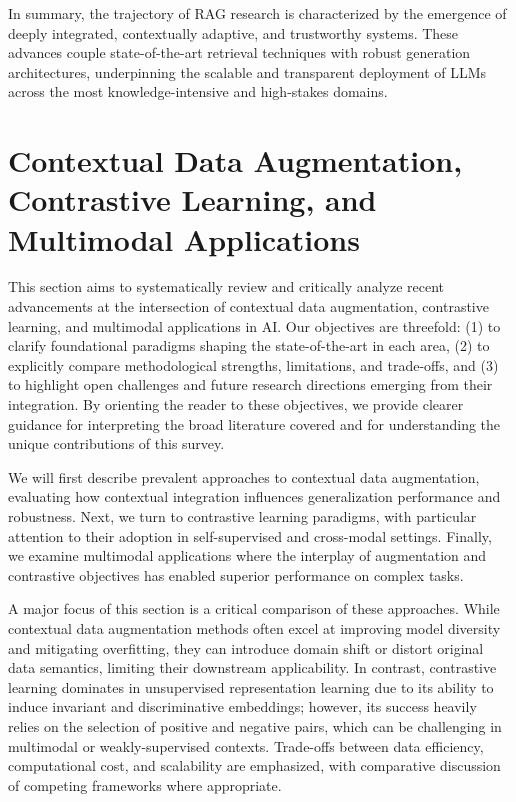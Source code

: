 \documentclass[sigconf]{acmart}
\begin{document}
In summary, the trajectory of RAG research is characterized by the emergence of deeply integrated, contextually adaptive, and trustworthy systems. These advances couple state-of-the-art retrieval techniques with robust generation architectures, underpinning the scalable and transparent deployment of LLMs across the most knowledge-intensive and high-stakes domains.

\section{Contextual Data Augmentation, Contrastive Learning, and Multimodal Applications}

This section aims to systematically review and critically analyze recent advancements at the intersection of contextual data augmentation, contrastive learning, and multimodal applications in AI. Our objectives are threefold: (1) to clarify foundational paradigms shaping the state-of-the-art in each area, (2) to explicitly compare methodological strengths, limitations, and trade-offs, and (3) to highlight open challenges and future research directions emerging from their integration. By orienting the reader to these objectives, we provide clearer guidance for interpreting the broad literature covered and for understanding the unique contributions of this survey.

We will first describe prevalent approaches to contextual data augmentation, evaluating how contextual integration influences generalization performance and robustness. Next, we turn to contrastive learning paradigms, with particular attention to their adoption in self-supervised and cross-modal settings. Finally, we examine multimodal applications where the interplay of augmentation and contrastive objectives has enabled superior performance on complex tasks.

A major focus of this section is a critical comparison of these approaches. While contextual data augmentation methods often excel at improving model diversity and mitigating overfitting, they can introduce domain shift or distort original data semantics, limiting their downstream applicability. In contrast, contrastive learning dominates in unsupervised representation learning due to its ability to induce invariant and discriminative embeddings; however, its success heavily relies on the selection of positive and negative pairs, which can be challenging in multimodal or weakly-supervised contexts. Trade-offs between data efficiency, computational cost, and scalability are emphasized, with comparative discussion of competing frameworks where appropriate.
\end{document}
